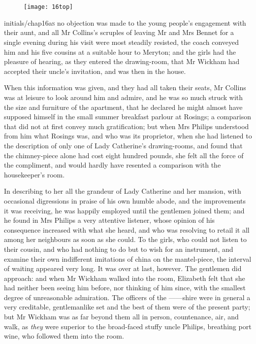 \chapter[Chapter \thechapter]{}
	
	\begin{figure}[t!]
\centering
\texttt{[image: 16top]}
\end{figure}

\lettrine[lines=6,image=true,loversize=.18]{initials/chap16a}{s}  no objection was made to the young people's engagement with their aunt, and all Mr Collins's scruples of leaving Mr and Mrs Bennet for a single evening during his visit were most steadily resisted, the coach conveyed him and his five cousins at a suitable hour to Meryton; and the girls had the pleasure of hearing, as they entered the drawing-room, that Mr Wickham had accepted their uncle's invitation, and was then in the house.

When this information was given, and they had all taken their seats, Mr Collins was at leisure to look around him and admire, and he was so much struck with the size and furniture of the apartment, that he declared he might almost have supposed himself in the small summer breakfast parlour at Rosings; a comparison that did not at first convey much gratification; but when Mrs Philips understood from him what Rosings was, and who was its proprietor, when she had listened to the description of only one of Lady Catherine's drawing-rooms, and found that the chimney-piece alone had cost eight hundred pounds, she felt all the force of the compliment, and would hardly have resented a comparison with the housekeeper's room.



In describing to her all the grandeur of Lady Catherine and her mansion, with occasional digressions in praise of his own humble abode, and the improvements it was receiving, he was happily employed until the gentlemen joined them; and he found in Mrs Philips a very attentive listener, whose opinion of his consequence increased with what she heard, and who was resolving to retail it all among her neighbours as soon as she could. To the girls, who could not listen to their cousin, and who had nothing to do but to wish for an instrument, and examine their own indifferent imitations of china on the mantel-piece, the interval of waiting appeared very long. It was over at last, however. The gentlemen did approach: and when Mr Wickham walked into the room, Elizabeth felt that she had neither been seeing him before, nor thinking of him since, with the smallest degree of unreasonable admiration. The officers of the ——shire were in general a very creditable, gentlemanlike set and the best of them were of the present party; but Mr Wickham was as far beyond them all in person, countenance, air, and walk, as \textit{they} were superior to the broad-faced stuffy uncle Philips, breathing port wine, who followed them into the room.

